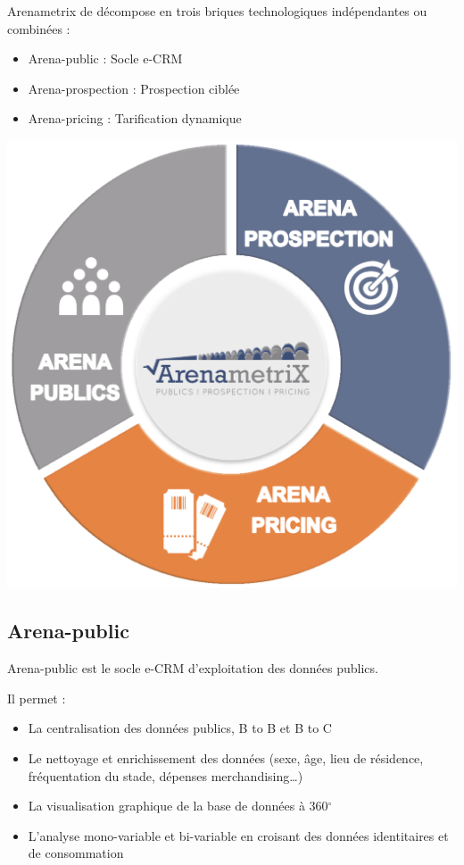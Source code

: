 Arenametrix de décompose en trois briques technologiques indépendantes ou combinées : 
\begin{itemize}
  \item[\textbullet] Arena-public : Socle e-CRM
  \item[\textbullet] Arena-prospection : Prospection ciblée
  \item[\textbullet] Arena-pricing : Tarification dynamique
\end{itemize}

\begin{center}
\includegraphics[scale=0.45]{images/arenametrix.png}
\label{arenametrix}
\end{center}

\subsection{Arena-public}
Arena-public est le socle e-CRM d’exploitation des données publics.

Il permet :
\begin{itemize}
  \item[\textbullet] La centralisation des données publics, B to B et B to C
  \item[\textbullet] Le nettoyage et enrichissement des données (sexe, âge, lieu de résidence, fréquentation du stade, dépenses merchandising…)
  \item[\textbullet] La visualisation graphique de la base de données à 360\ensuremath{^\circ}
  \item[\textbullet] L'analyse mono-variable et bi-variable en croisant des données identitaires et de consommation
\end{itemize}

